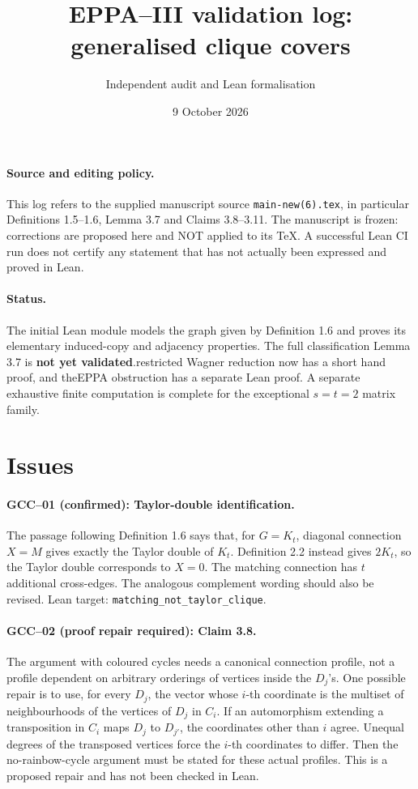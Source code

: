 \documentclass[11pt,a4paper]{article}
\title{EPPA--III validation log: generalised clique covers}
\author{Independent audit and Lean formalisation}
\date{9 October 2026}
\begin{document}
\maketitle

\paragraph{Source and editing policy.}
This log refers to the supplied manuscript source \texttt{main-new(6).tex},
in particular Definitions 1.5--1.6, Lemma 3.7 and Claims 3.8--3.11.
The manuscript is frozen: corrections are proposed here and NOT applied
to its TeX. A successful Lean CI run does not certify any statement that
has not actually been expressed and proved in Lean.

\paragraph{Status.}
The initial Lean module models the graph given by Definition 1.6 and
proves its elementary induced-copy and adjacency properties.
The full classification Lemma 3.7 is \textbf{not yet validated}.\nThe restricted Wagner reduction now has a short hand proof, and the\ncube EPPA obstruction has a separate Lean proof.
A separate exhaustive finite computation is complete for the
exceptional \(s=t=2\) matrix family.

\section*{Issues}

\paragraph{GCC--01 (confirmed): Taylor-double identification.}
The passage following Definition 1.6 says that, for \(G=K_t\),
diagonal connection \(X=M\) gives exactly the Taylor double of \(K_t\).
Definition 2.2 instead gives \(2K_t\), so the Taylor double corresponds
to \(X=0\). The matching connection has \(t\) additional cross-edges.
The analogous complement wording should also be revised.
Lean target: \texttt{matching\_not\_taylor\_clique}.

\paragraph{GCC--02 (proof repair required): Claim 3.8.}
The argument with coloured cycles needs a canonical connection profile,
not a profile dependent on arbitrary orderings of vertices inside the
\(D_j\)'s. One possible repair is to use, for every \(D_j\), the vector
whose \(i\)-th coordinate is the multiset of neighbourhoods of the
vertices of \(D_j\) in \(C_i\). If an automorphism extending a
transposition in \(C_i\) maps \(D_j\) to \(D_{j'}\), the coordinates other
than \(i\) agree. Unequal degrees of the transposed vertices force
the \(i\)-th coordinates to differ. Then the no-rainbow-cycle argument
must be stated for these actual profiles. This is a proposed repair
and has not been checked in Lean.
\end{document}
